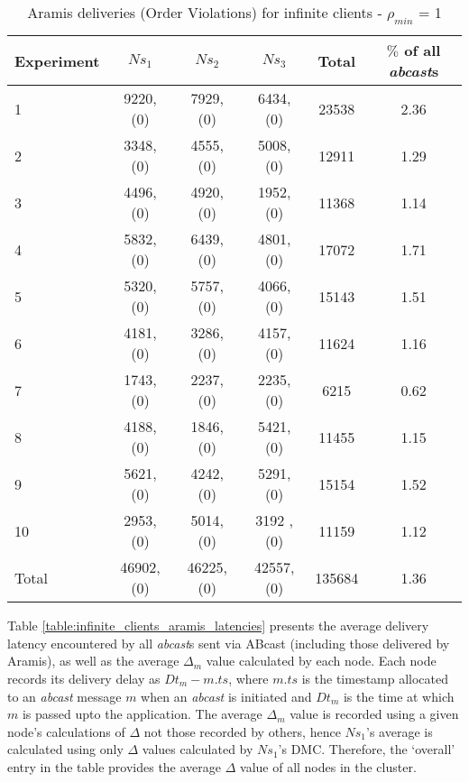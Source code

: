 \begin{table}[p]
  \begin{center}
  \renewcommand{\arraystretch}{1.3}
   \begin{tabular}{|l|c|c|c|c|c|}
    \hline
    Experiment & $Ns_1$ & $Ns_2$       & $Ns_3$      & Total    & $\%$ of all \emph{abcast}s \\ \hline \hline
    1          & 9220, (0)  & 7929, (0)  & 6434, (0)  & 23538 & 2.36 \\ \hline
    2          & 3348, (0)  & 4555, (0)  & 5008, (0)  & 12911 & 1.29 \\ \hline
    3          & 4496, (0)  & 4920, (0)  & 1952, (0)  & 11368 & 1.14 \\ \hline
    4          & 5832, (0)  & 6439, (0)  & 4801, (0)  & 17072 & 1.71 \\ \hline
    5          & 5320, (0)  & 5757, (0)  & 4066, (0)  & 15143 & 1.51 \\ \hline
    6          & 4181, (0)  & 3286, (0)  & 4157, (0)  & 11624 & 1.16 \\ \hline
    7          & 1743, (0)  & 2237, (0)  & 2235, (0)  & 6215   & 0.62 \\ \hline
    8          & 4188, (0)  & 1846, (0)  & 5421, (0)  & 11455 & 1.15 \\ \hline
    9          & 5621, (0)  & 4242, (0)  & 5291, (0)  & 15154 & 1.52 \\ \hline
    10        & 2953, (0)  & 5014, (0)  & 3192 , (0) & 11159 & 1.12 \\ \hline \hline
    Total    &46902, (0) &46225, (0) &42557, (0) &135684 & 1.36\\ \hline
    \end{tabular}
    \caption[Aramis deliveries for Infinite Clients - $\rho_{min}$ = 1]{Aramis deliveries (Order Violations) for infinite clients - $\rho_{min}$ = 1}
    \label{table:infinite_clients_rejections}
  \end{center}
\end{table}
    
    Table \ref{table:infinite_clients_aramis_latencies} presents the average delivery latency encountered by all \emph{abcast}s sent via \textsf{ABcast} (including those delivered by \textsf{Aramis}), as well as the average $\Delta_m$ value calculated by each node.  Each node records its delivery delay as $Dt_m - m.ts$, where $m.ts$ is the timestamp allocated to an \emph{abcast} message $m$ when an \emph{abcast} is initiated and $Dt_m$ is the time at which $m$ is passed upto the application.  The average $\Delta_m$ value is recorded using a given node's calculations of $\Delta$ not those recorded by others, hence $Ns_1$'s average is calculated using only $\Delta$ values calculated by $Ns_1$'s DMC.  Therefore, the \textquoteleft{}overall' entry in the table provides the average $\Delta$ value of all nodes in the cluster.  
    
